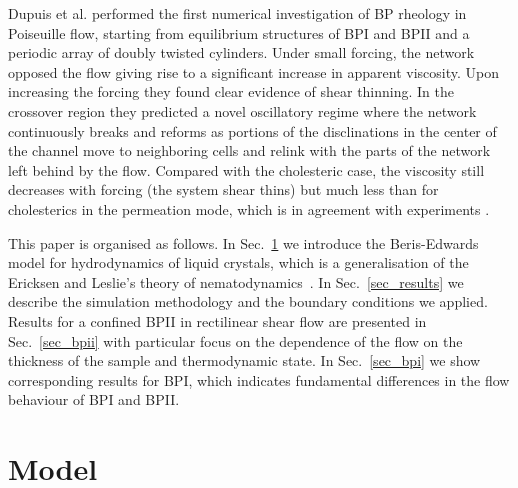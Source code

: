 \documentclass[12pt,twoside]{iopart}
\begin{document}
Dupuis et al. \cite{Dupuis:2005} performed the first numerical investigation of BP rheology in Poiseuille flow, starting from equilibrium structures of BPI and BPII and a periodic array of doubly twisted cylinders.
Under small forcing, the network opposed the flow giving rise to a significant increase in apparent viscosity.
Upon increasing the forcing they found clear evidence of shear thinning.
In the crossover region they predicted a novel oscillatory regime where the network continuously breaks and reforms as portions of the disclinations in the center of the channel move to neighboring cells and relink with the parts of the network left behind by the flow. Compared with the cholesteric case, the viscosity still decreases with forcing (the system shear thins) but much less than
for cholesterics in the permeation mode, which is in agreement with experiments
\cite{Zapotocky:1999, Ramos:2002}.

This paper is organised as follows.
In Sec.~\ref{sec_model} we introduce the Beris-Edwards model for hydrodynamics
of liquid crystals, which is a generalisation of the Ericksen and Leslie's
theory of nematodynamics~\cite{deGennes}.
In Sec.~\ref{sec_results} we describe the simulation methodology and the
boundary conditions we applied.
Results for a confined BPII in rectilinear shear flow are presented in
Sec.~\ref{sec_bpii} with particular focus on the dependence of the flow
on the thickness of the sample and thermodynamic state.
In Sec.~\ref{sec_bpi} we show corresponding results for BPI, which indicates fundamental differences in the flow behaviour of BPI and BPII. 

\section{Model}\label{sec_model}
\end{document}
